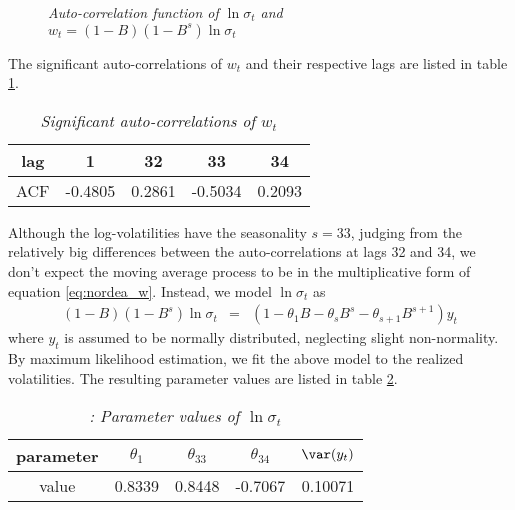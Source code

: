 \begin{figure}[htb!]
  \centering
  \caption{\small \it Auto-correlation function of $\ln \sigma_t$ and
    $w_t = (1 - B)(1-B^s)\ln \sigma_t$} 
\end{figure}
The significant auto-correlations of $w_t$ and their respective lags are listed
in table \ref{tab:nordea2_w_acf}.
\begin{table}[htb!]
  \centering
  \begin{tabular}{|c|c|c|c|c|}
    \hline
    lag & 1 & 32 & 33 & 34 \\
    \hline
    ACF &   -0.4805 & 0.2861 &  -0.5034 & 0.2093 \\
    \hline
  \end{tabular}
  \caption{\small \it Significant auto-correlations of $w_t$}
  \label{tab:nordea2_w_acf}
\end{table}
Although the log-volatilities have the seasonality $s = 33$, judging
from the relatively big differences between the auto-correlations at
lags 32 and 34, we don't expect the moving average process to be in the
multiplicative form of equation \ref{eq:nordea_w}. Instead, we model
$\ln\sigma_t$ as
\begin{eqnarray}
  (1 - B)(1 - B^s) \ln\sigma_t &=& (1 - \theta_1 B - \theta_s B^s -
  \theta_{s+1} B^{s+1} ) y_t \label{eq:nordea2_v}
\end{eqnarray}
where $y_t$ is assumed to be normally distributed, neglecting slight
non-normality. By maximum likelihood estimation, we fit the above
model to the realized volatilities. The resulting parameter values are
listed in table \ref{tab:nordea2_15_SV}.

\begin{table}[htb!]
  \centering
  \begin{tabular}{|c|c|c|c|c|}
    \hline
    parameter & $\theta_1$ & $\theta_{33}$ & $\theta_{34}$ & $\var(y_t)$ \\
    \hline
    value & 0.8339 & 0.8448 & -0.7067 & 0.10071 \\
    \hline
  \end{tabular}
  \caption{\small \it: Parameter values of $\ln \sigma_t$}
  \label{tab:nordea2_15_SV}
\end{table}

